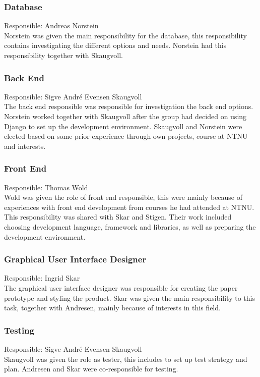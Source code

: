 \subsubsection{Database}
Responsible: Andreas Norstein\\
Norstein was given the main responsibility for the database, this responsibility contains investigating the different options and needs. Norstein had this responsibility together with Skaugvoll.

\subsubsection{Back End}
Responsible: Sigve André Evensen Skaugvoll\\
The back end responsible was responsible for investigation the back end options. Norstein worked together with Skaugvoll after the group had decided on using Django to set up the development environment. Skaugvoll and Norstein were elected based on some prior experience through own projects, course at NTNU and interests.

\subsubsection{Front End}
Responsible: Thomas Wold\\
Wold was given the role of front end responsible, this were mainly because of experiences with front end development from courses he had attended at NTNU. This responsibility was shared with Skar and Stigen. Their work included choosing development language, framework and libraries, as well as preparing the development environment.

\subsubsection{Graphical User Interface Designer}
Responsible: Ingrid Skar\\
The graphical user interface designer was responsible for creating the paper prototype and styling the product. Skar was given the main responsibility to this task, together with Andresen, mainly because of interests in this field.

\subsubsection{Testing}
Responsible: Sigve André Evensen Skaugvoll\\
Skaugvoll was given the role as tester, this includes to set up test strategy and plan. Andresen and Skar were co-responsible for testing. 

